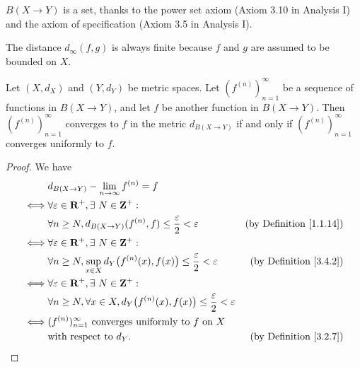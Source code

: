 \begin{note}
    \(B(X \to Y)\) is a set, thanks to the power set axiom (Axiom 3.10 in Analysis I) and the axiom of specification (Axiom 3.5 in Analysis I).
\end{note}

\begin{note}
    The distance \(d_\infty(f, g)\) is always finite because \(f\) and \(g\) are assumed to be bounded on \(X\).
\end{note}

\setcounter{theorem}{3}
\begin{proposition}\label{3.4.4}
    Let \((X, d_X)\) and \((Y, d_Y)\) be metric spaces.
    Let \((f^{(n)})_{n = 1}^\infty\) be a sequence of functions in \(B(X \to Y)\), and let \(f\) be another function in \(B(X \to Y)\).
    Then \((f^{(n)})_{n = 1}^\infty\) converges to \(f\) in the metric \(d_{B(X \to Y)}\) if and only if \((f^{(n)})_{n = 1}^\infty\) converges uniformly to \(f\).
\end{proposition}

\begin{proof}
    We have
    \begin{align*}
             & d_{B(X \to Y)} - \lim_{n \to \infty} f^{(n)} = f                                                                                                \\
        \iff & \forall \varepsilon \in \mathbf{R}^+, \exists\ N \in \mathbf{Z}^+ :                                                                             \\
             & \forall n \geq N, d_{B(X \to Y)}(f^{(n)}, f) \leq \frac{\varepsilon}{2} < \varepsilon                     & \text{(by Definition \ref{1.1.14})} \\
        \iff & \forall \varepsilon \in \mathbf{R}^+, \exists\ N \in \mathbf{Z}^+ :                                                                             \\
             & \forall n \geq N, \sup_{x \in X} d_Y\big(f^{(n)}(x), f(x)\big) \leq \frac{\varepsilon}{2} < \varepsilon   & \text{(by Definition \ref{3.4.2})}  \\
        \iff & \forall \varepsilon \in \mathbf{R}^+, \exists\ N \in \mathbf{Z}^+ :                                                                             \\
             & \forall n \geq N, \forall x \in X, d_Y\big(f^{(n)}(x), f(x)\big) \leq \frac{\varepsilon}{2} < \varepsilon                                       \\
        \iff & (f^{(n)})_{n = 1}^\infty \text{ converges uniformly to } f \text{ on } X                                                                        \\
             & \text{with respect to } d_Y.                                                                              & \text{(by Definition \ref{3.2.7})}
    \end{align*}
\end{proof}

